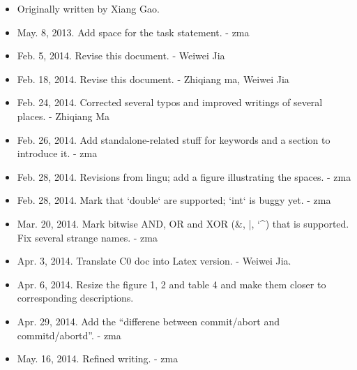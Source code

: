 \documentclass[a4paper]{article}
\begin{document}
\begin{itemize}
	\item Originally written by Xiang Gao.
	\item May. 8, 2013. Add space for the task statement. - zma
	\item Feb. 5, 2014. Revise this document. - Weiwei Jia
	\item Feb. 18, 2014. Revise this document. - Zhiqiang ma, Weiwei Jia
	\item Feb. 24, 2014. Corrected several typos and improved writings of several places. - Zhiqiang Ma
	\item Feb. 26, 2014. Add standalone-related stuff for keywords and a section to introduce it. - zma
	\item Feb. 28, 2014. Revisions from lingu; add a figure illustrating the spaces. - zma
	\item Feb. 28, 2014. Mark that `double` are supported; `int` is buggy yet. - zma
	\item Mar. 20, 2014. Mark bitwise AND, OR and XOR (\&, |, {\char`\^}) that is supported. Fix several strange names. - zma
	\item Apr. 3, 2014. Translate C0 doc into Latex version. - Weiwei Jia.
    \item Apr. 6, 2014. Resize the figure 1, 2 and table 4 and make them closer to corresponding descriptions.
    \item Apr. 29, 2014. Add the ``differene between commit/abort and commitd/abortd''. - zma
    \item May. 16, 2014. Refined writing. - zma
\end{itemize}

\\
\end{document}
